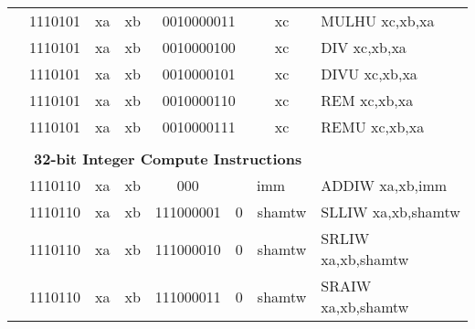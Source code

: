 \begin{table}[p]
\begin{small}
\begin{center}
\begin{tabular}{rcccccccccl}
&
\multicolumn{2}{|c|}{1110101} &
\multicolumn{1}{c|}{xa} &
\multicolumn{1}{c|}{xb} &
\multicolumn{4}{c|}{0010000011} &
\multicolumn{1}{c|}{xc} & MULHU xc,xb,xa \\
\cline{2-10}
  

&
\multicolumn{2}{|c|}{1110101} &
\multicolumn{1}{c|}{xa} &
\multicolumn{1}{c|}{xb} &
\multicolumn{4}{c|}{0010000100} &
\multicolumn{1}{c|}{xc} & DIV xc,xb,xa \\
\cline{2-10}
  

&
\multicolumn{2}{|c|}{1110101} &
\multicolumn{1}{c|}{xa} &
\multicolumn{1}{c|}{xb} &
\multicolumn{4}{c|}{0010000101} &
\multicolumn{1}{c|}{xc} & DIVU xc,xb,xa \\
\cline{2-10}
  

&
\multicolumn{2}{|c|}{1110101} &
\multicolumn{1}{c|}{xa} &
\multicolumn{1}{c|}{xb} &
\multicolumn{4}{c|}{0010000110} &
\multicolumn{1}{c|}{xc} & REM xc,xb,xa \\
\cline{2-10}
  

&
\multicolumn{2}{|c|}{1110101} &
\multicolumn{1}{c|}{xa} &
\multicolumn{1}{c|}{xb} &
\multicolumn{4}{c|}{0010000111} &
\multicolumn{1}{c|}{xc} & REMU xc,xb,xa \\
\cline{2-10}
  

&
\multicolumn{9}{c}{} & \\
&
\multicolumn{9}{c}{\bf 32-bit Integer Compute Instructions} & \\
\cline{2-10}
  

&
\multicolumn{2}{|c|}{1110110} &
\multicolumn{1}{c|}{xa} &
\multicolumn{1}{c|}{xb} &
\multicolumn{1}{c|}{000} &
\multicolumn{4}{c|}{imm} & ADDIW xa,xb,imm \\
\cline{2-10}
  

&
\multicolumn{2}{|c|}{1110110} &
\multicolumn{1}{c|}{xa} &
\multicolumn{1}{c|}{xb} &
\multicolumn{3}{c|}{111000001} &
\multicolumn{1}{c|}{0} &
\multicolumn{1}{c|}{shamtw} & SLLIW xa,xb,shamtw \\
\cline{2-10}
  

&
\multicolumn{2}{|c|}{1110110} &
\multicolumn{1}{c|}{xa} &
\multicolumn{1}{c|}{xb} &
\multicolumn{3}{c|}{111000010} &
\multicolumn{1}{c|}{0} &
\multicolumn{1}{c|}{shamtw} & SRLIW xa,xb,shamtw \\
\cline{2-10}
  

&
\multicolumn{2}{|c|}{1110110} &
\multicolumn{1}{c|}{xa} &
\multicolumn{1}{c|}{xb} &
\multicolumn{3}{c|}{111000011} &
\multicolumn{1}{c|}{0} &
\multicolumn{1}{c|}{shamtw} & SRAIW xa,xb,shamtw \\
\cline{2-10}
  


\end{tabular}
\end{center}
\end{small}
\end{table}
